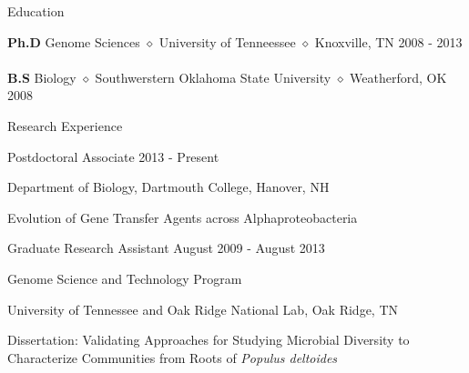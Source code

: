 \documentclass{resume} %
\begin{document}

\begin{rSection}{Education}

{\bf Ph.D} Genome Sciences {$\diamond$} University of Tenneessee {$\diamond$} Knoxville, TN \hfill {2008 - 2013} 
\\
\\
{\bf B.S}  Biology {$\diamond$} Southwerstern Oklahoma State University {$\diamond$}  Weatherford, OK \hfill{2008}
\end{rSection}


\begin{rSection}{Research Experience}
\begin{rSubsection}{Postdoctoral Associate} {2013 - Present}{}{}
\item Department of Biology, Dartmouth College, Hanover, NH
\item Evolution of Gene Transfer Agents across Alphaproteobacteria
\end{rSubsection}

\begin{rSubsection}{Graduate Research Assistant} {August 2009 - August 2013}{}{}
\item Genome Science and Technology Program
\item University of Tennessee and Oak Ridge National Lab, Oak Ridge, TN 
\item Dissertation: Validating Approaches for Studying Microbial Diversity to Characterize Communities from Roots of \textit{Populus deltoides}
\end{rSubsection}
\end{rSection}

\end{document}
